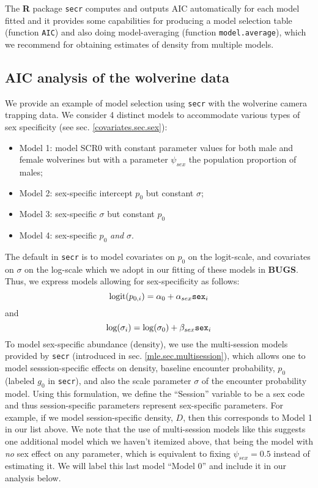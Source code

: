 The {\bf R} package \mbox{\tt secr} computes and outputs AIC
automatically for each model fitted and it provides some capabilities
for producing a model selection table (function \mbox{\tt AIC}) and
also doing model-averaging (function \mbox{\tt model.average}), which
we recommend for obtaining estimates of density from multiple models.

\subsection{AIC analysis of the wolverine data}

We provide an example of model selection using \mbox{\tt secr} with the
wolverine camera trapping data. We consider 4 distinct models to accommodate
various types of sex specificity (see sec. \ref{covariates.sec.sex}):
\hspace{.5in} \begin{itemize}
\item[] Model 1: model SCR0 with constant parameter
values for both male and female wolverines but with a parameter
$\psi_{sex}$ the population proportion of males;
\item[] Model 2: sex-specific intercept
$p_{0}$ but constant $\sigma$;
\item[] Model 3: sex-specific $\sigma$ but constant
$p_{0}$
\item[] Model 4: sex-specific $p_{0}$ {\it and} $\sigma$.
\end{itemize}
The default in \mbox{\tt secr} is to model covariates on $p_{0}$ on
the logit-scale, and covariates on $\sigma$ on the
log-scale which we adopt in our fitting of these models in {\bf
  BUGS}. Thus,  we express  models allowing for sex-specificity
as follows:
\[
 \mbox{logit}(p_{0,i}) = \alpha_{0} + \alpha_{sex} \mbox{\tt sex}_{i}
\]
and
\[
 \mbox{log}(\sigma_{i}) = \log(\sigma_{0}) + \beta_{sex} \mbox{\tt sex}_{i}
\]
To model sex-specific abundance (density), 
we
 use the multi-session models  provided by
\mbox{\tt secr} (introduced in sec. \ref{mle.sec.multisession}), which
allows one to model sesssion-specific effects on density, baseline
encounter probability, $p_{0}$ (labeled $g_{0}$ in \mbox{\tt secr}), and also the scale
parameter $\sigma$ of the encounter probability model. Using this
formulation, we define the ``Session'' variable to be a sex code and
thus session-specific parameters represent sex-specific parameters.
For example, if we model session-specific density, $D$, then this
corresponds to Model 1 in our list above.  We note that the use of
multi-session models like this suggests
one additional model which we haven't itemized above, that being the
model with {\it no} sex effect on any parameter, which is equivalent
to fixing $\psi_{sex} = 0.5$ instead of estimating it. We will label
this last model ``Model 0'' and include it in our analysis below.


